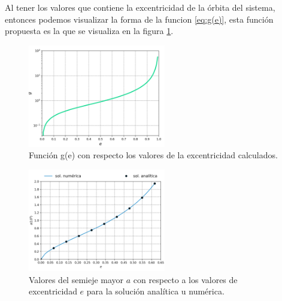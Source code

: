 Al tener los valores que contiene la excentricidad de la órbita del sistema, entonces podemos visualizar la forma de la funcion \ref{eq:g(e)}, esta 
función propuesta es la que se visualiza en la figura \ref{fig:gvse}.\\
\begin{minipage}{0.40\linewidth}
    \begin{figure}[H]
        \centering
        \includegraphics[height=4.5cm]{images/gvse.png}
        \caption{Función g(e) con respecto los valores de la excentricidad calculados.}
        \label{fig:gvse}
    \end{figure} 
\end{minipage}
\hspace{0.5cm}
\begin{minipage}{0.55\linewidth}
\begin{figure}[H]
    \centering
    \includegraphics[height=4.5cm]{images/solana_solnum.png}
    \caption{Valores del semieje mayor $a$ con respecto a los valores de excentricidad $e$ para la solución analítica u numérica.}
    \label{fig:ananum}
\end{figure}
\end{minipage}\\\\

